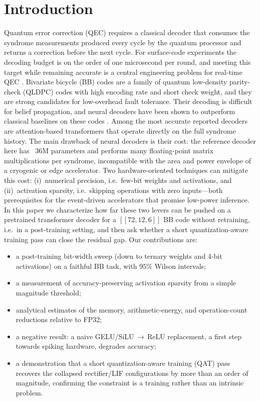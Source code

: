 ﻿\documentclass[conference]{IEEEtran}
\begin{document}
\section{Introduction}
Quantum error correction (QEC) requires a classical decoder that consumes
the syndrome measurements produced every cycle by the quantum processor and
returns a correction before the next cycle. For surface-code experiments
the decoding budget is on the order of one microsecond per round, and
meeting this target while remaining accurate is a central engineering
problem for real-time QEC \cite{dennis2002,google2023}.
Bivariate bicycle (BB) codes \cite{bravyi2024} are a family of quantum
low-density parity-check (QLDPC) codes with high encoding rate and short
check weight, and they are strong candidates for low-overhead fault
tolerance. Their decoding is difficult for belief propagation, and neural
decoders have been shown to outperform classical baselines on these codes
\cite{blue2026,LiuDiff25,CaoGen25,MiMueller25}. Among the most accurate reported decoders are attention-based
transformers that operate directly on the full syndrome history.
The main drawback of neural decoders is their cost: the reference decoder
here has ~36M parameters and performs many floating-point matrix
multiplications per syndrome, incompatible with the area and power
envelope of a cryogenic or edge accelerator. Two hardware-oriented techniques can mitigate this cost:
(i)~numerical precision, i.e.\ few-bit weights and activations, and
(ii)~activation sparsity, i.e.\ skipping operations with zero inputs---both
prerequisites for the event-driven accelerators that promise low-power
inference.
In this paper we characterize how far these two levers can be pushed on a
pretrained transformer decoder for a $[[72,12,6]]$ BB code without
retraining, i.e.\ in a post-training setting, and then ask whether a
short quantization-aware training pass can close the residual gap. Our
contributions are:
\begin{itemize}
\item a post-training bit-width sweep (down to ternary weights and 4-bit
      activations) on a faithful BB task, with $95\%$ Wilson intervals;
\item a measurement of accuracy-preserving activation sparsity from a
      simple magnitude threshold;
\item analytical estimates of the memory, arithmetic-energy, and
      operation-count reductions relative to FP32;
\item a negative result: a naive GELU/SiLU\,$\rightarrow$\,ReLU
      replacement, a first step towards spiking hardware, degrades
      accuracy;
\item a demonstration that a short quantization-aware training (QAT)
      pass recovers the collapsed rectifier/LIF configurations by more
      than an order of magnitude, confirming the constraint is a training
      rather than an intrinsic problem.
\end{itemize}
\end{document}
